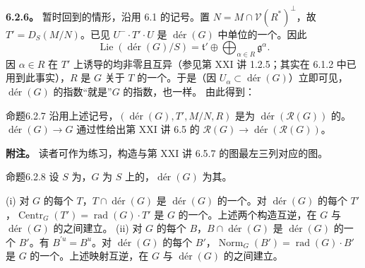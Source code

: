 \textbf{6.2.6。} 暂时回到的情形，沿用 6.1 的记号。置 $N=M\cap\mathscr V(R^*)^\perp$，故 $T'=D_S(M/N)$。已见 $U^-\cdot T'\cdot U$ 是 $\operatorname{d\text{é}r}(G)$ 中单位的一个。因此
\[\operatorname{Lie}(\operatorname{d\text{é}r}(G)/S)=\mathfrak t'\oplus\bigoplus_{\alpha\in R}\mathfrak g^\alpha.\]
因 $\alpha\in R$ 在 $T'$ 上诱导的均非零且互异（参见第 XXI 讲 1.2.5；其实在 6.1.2 中已用到此事实），$R$ 是 $G$ 关于 $T$ 的一个。于是（因 $U_\alpha\subset\operatorname{d\text{é}r}(G)$）立即可见，$\operatorname{d\text{é}r}(G)$ 的指数“就是”$G$ 的指数，也一样。
由此得到：
\begin{SGAresult}{命题}{6.2.7}
沿用上述记号，$(\operatorname{d\text{é}r}(G),T',M/N,R)$ 是为 $\operatorname{d\text{é}r}(\mathcal R(G))$ 的。 $\operatorname{d\text{é}r}(G)\to G$ 通过性给出第 XXI 讲 6.5 的 $\mathcal R(G)\to\operatorname{d\text{é}r}(\mathcal R(G))$。
\end{SGAresult}
\textbf{附注。} 读者可作为练习，构造与第 XXI 讲 6.5.7 的图最左三列对应的图。
\begin{SGAresult}{命题}{6.2.8}
设 $S$ 为，$G$ 为 $S$ 上的，$\operatorname{d\text{é}r}(G)$ 为其。

(i) 对 $G$ 的每个 $T$，$T\cap\operatorname{d\text{é}r}(G)$ 是 $\operatorname{d\text{é}r}(G)$ 的一个。对 $\operatorname{d\text{é}r}(G)$ 的每个 $T'$，$\operatorname{Centr}_G(T')=\operatorname{rad}(G)\cdot T'$ 是 $G$ 的一个。上述两个构造互逆，在 $G$ 与 $\operatorname{d\text{é}r}(G)$ 的之间建立。
(ii) 对 $G$ 的每个 $B$，$B\cap\operatorname{d\text{é}r}(G)$ 是 $\operatorname{d\text{é}r}(G)$ 的一个 $B'$。有 $B^{\prime u}=B^u$。对 $\operatorname{d\text{é}r}(G)$ 的每个 $B'$，$\operatorname{Norm}_G(B')=\operatorname{rad}(G)\cdot B'$ 是 $G$ 的一个。上述映射互逆，在 $G$ 与 $\operatorname{d\text{é}r}(G)$ 的之间建立。
\end{SGAresult}
